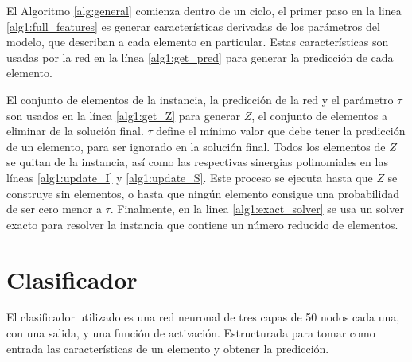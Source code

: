 \documentclass[spanish, a4paper, 12pt, openany,final]{book}
\begin{document}
El Algoritmo \ref{alg:general} comienza dentro de un ciclo, el primer paso en la linea \ref{alg1:full_features} es generar características derivadas de los parámetros del modelo, que describan a cada elemento en particular. Estas características son usadas por la red en la línea \ref{alg1:get_pred} para generar la predicción de cada elemento.

El conjunto de elementos de la instancia, la predicción de la red y el parámetro $\tau$ son usados en la línea \ref{alg1:get_Z} para generar $Z$, el conjunto de elementos a eliminar de la solución final. $\tau$ define el mínimo valor que debe tener la predicción de un elemento, para ser ignorado en la solución final. Todos los elementos de $Z$ se quitan de la instancia, así como las respectivas sinergias polinomiales en las líneas \ref{alg1:update_I} y \ref{alg1:update_S}. Este proceso se ejecuta hasta que $Z$ se construye sin elementos, o hasta que ningún elemento consigue una probabilidad de ser cero menor a $\tau$. Finalmente, en la linea \ref{alg1:exact_solver} se usa un solver exacto para resolver la instancia que contiene un número reducido de elementos.






\newcommand{\algrule}[1][.2pt]{\par\vskip.5\baselineskip\hrule height #1\par\vskip.5\baselineskip}








\section{Clasificador}

El clasificador utilizado es una red neuronal de tres capas de 50 nodos cada una, con una salida, y una función de activación. Estructurada para tomar como entrada las características de un elemento y obtener la predicción.
\end{document}
